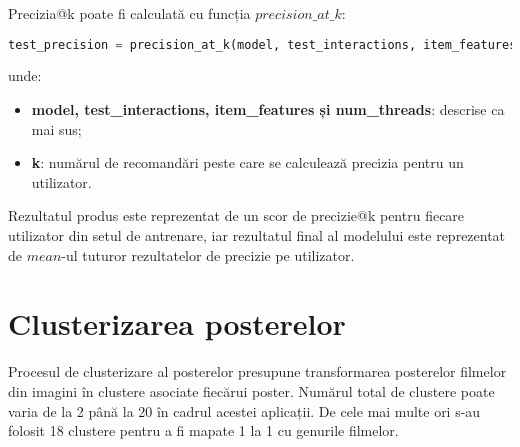 Precizia@k poate fi calculată cu funcția $precision\_at\_k$:

\begin{lstlisting}[language=Python, caption=Precizia@k a unui model]
test_precision = precision_at_k(model, test_interactions, item_features=item_features, k=k, num_threads=threads).mean()
\end{lstlisting}
unde:
\begin{itemize}
	\item \textbf{model, test\_interactions, item\_features și num\_threads}: descrise ca mai sus;
	\item \textbf{k}: numărul de recomandări peste care se calculează precizia pentru un utilizator.
\end{itemize}
Rezultatul produs este reprezentat de un scor de precizie@k pentru fiecare utilizator din setul de antrenare, iar rezultatul final al modelului este reprezentat de $mean$-ul tuturor rezultatelor de precizie pe utilizator.

\section{Clusterizarea posterelor}
Procesul de clusterizare al posterelor presupune transformarea posterelor filmelor din imagini în clustere asociate fiecărui poster. Numărul total de clustere poate varia de la 2 până la 20 în cadrul acestei aplicații. De cele mai multe ori s-au folosit 18 clustere pentru a fi mapate 1 la 1 cu genurile filmelor.

